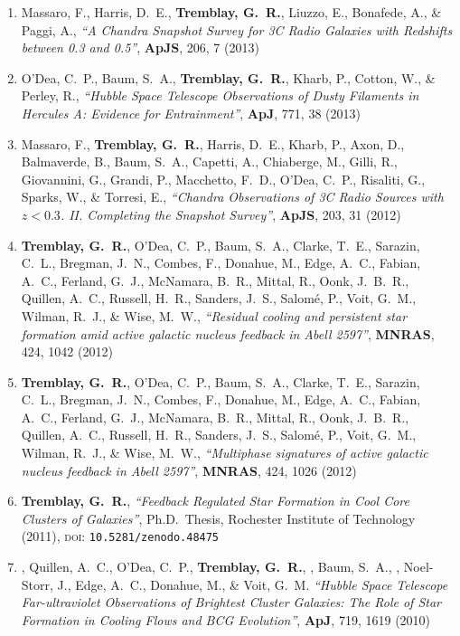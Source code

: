 \documentclass[11pt]{article}
\begin{document}
\begin{enumerate}
\item Massaro, F., Harris, D.~E., \textbf{Tremblay, G.~R.}, Liuzzo, E., Bonafede, A.,
\& Paggi, A., \textit{``A Chandra Snapshot Survey for 3C Radio Galaxies with Redshifts between 0.3 and 0.5''}, \textbf{ApJS}, 206,  7 (2013)


\item O'Dea, C.~P., Baum, S.~A., \textbf{Tremblay, G.~R.}, Kharb, P., Cotton, W.,
\& Perley, R.,  \textit{``Hubble Space Telescope Observations of Dusty Filaments in Hercules A: Evidence for Entrainment''}, \textbf{ApJ}, 771,  38 (2013)


\item Massaro, F., \textbf{Tremblay, G.~R.}, Harris, D.~E., Kharb, P., Axon, D.,
Balmaverde, B., Baum, S.~A., Capetti, A., Chiaberge, M., Gilli, R.,
Giovannini, G., Grandi, P., Macchetto, F.~D., O'Dea, C.~P., Risaliti, G.,
Sparks, W., \& Torresi, E.,  \textit{``Chandra Observations of 3C Radio Sources with $z < 0.3$. II. Completing the Snapshot Survey''}, \textbf{ApJS}, 203,  31 (2012)


\item \textbf{Tremblay, G.~R.}, O'Dea, C.~P., Baum, S.~A., Clarke, T.~E., Sarazin,
C.~L., Bregman, J.~N., Combes, F., Donahue, M., Edge, A.~C., Fabian, A.~C.,
Ferland, G.~J., McNamara, B.~R., Mittal, R., Oonk, J.~B.~R., Quillen,
A.~C., Russell, H.~R., Sanders, J.~S., Salom{\'e}, P., Voit, G.~M., Wilman,
R.~J., \& Wise, M.~W., \textit{``Residual cooling and persistent star formation amid active galactic nucleus feedback in Abell 2597''}, \textbf{MNRAS}, 424,  1042 (2012)


\item \textbf{Tremblay, G.~R.}, O'Dea, C.~P., Baum, S.~A., Clarke, T.~E., Sarazin,
C.~L., Bregman, J.~N., Combes, F., Donahue, M., Edge, A.~C., Fabian, A.~C.,
Ferland, G.~J., McNamara, B.~R., Mittal, R., Oonk, J.~B.~R., Quillen,
A.~C., Russell, H.~R., Sanders, J.~S., Salom{\'e}, P., Voit, G.~M., Wilman,
R.~J., \& Wise, M.~W., \textit{ ``Multiphase signatures of active galactic nucleus feedback in Abell 2597''}, \textbf{MNRAS}, 424,  1026 (2012)



\item \textbf{Tremblay, G.~R.}, \textit{``Feedback Regulated Star Formation in Cool Core
Clusters of Galaxies''}, Ph.D.~Thesis, Rochester Institute of Technology (2011), \textsc{doi}: \texttt{10.5281/zenodo.48475}



\item {}, Quillen, A.~C., O'Dea, C.~P., \textbf{Tremblay, G.~R.}, , Baum, S.~A., , Noel-Storr, J., Edge, A.~C., Donahue,
M., \& Voit, G.~M.  \textit{``Hubble Space Telescope Far-ultraviolet Observations of Brightest Cluster Galaxies: The Role of Star Formation in Cooling Flows and BCG Evolution''}, \textbf{ApJ}, 719,  1619 (2010)




\end{enumerate}
\end{document}
